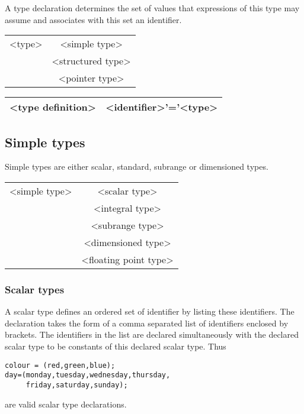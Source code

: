 A type declaration determines the set of values that expressions of this type
may assume and associates with this set an identifier.

\vspace{0.3cm}
{\centering \begin{tabular}{|c|c|}
\hline 
<type>&
<simple type>\\
&
<structured type>\\
&
<pointer type>\\
\hline 
\end{tabular}\par}
\vspace{0.3cm}

\vspace{0.3cm}
{\centering \begin{tabular}{|c|c|}
\hline 
<type definition>&
<identifier>'='<type> \\
\hline 
\end{tabular}\par}
\vspace{0.3cm}


\subsection{Simple types}

Simple types are either scalar, standard, subrange or dimensioned types.

\vspace{0.3cm}
{\centering \begin{tabular}{|c|c|}
\hline 
<simple type>&
<scalar type>\\
&
<integral type>\\
&
<subrange type>\\
&
<dimensioned type>\\
&
<floating point type>\\
\hline 
\end{tabular}\par}
\vspace{0.3cm}


\subsubsection{Scalar types}

A scalar type defines an ordered set of identifier
by listing these identifiers. The declaration takes the form of a comma separated
list of identifiers enclosed by brackets. The identifiers in the list are declared
simultaneously with the declared scalar type to be constants of this declared
scalar type. Thus 
\begin{verbatim}
colour = (red,green,blue);
day=(monday,tuesday,wednesday,thursday,
     friday,saturday,sunday);
\end{verbatim}
are valid scalar type declarations.


